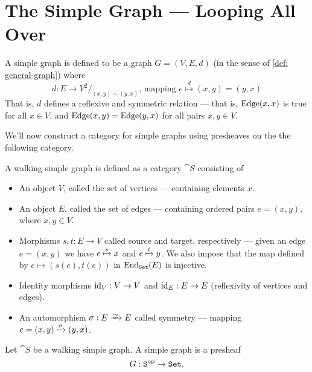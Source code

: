 \section{The Simple Graph --- Looping All Over}

\begin{definition}\label{def: simp-graph}
    A simple graph is defined to be a graph \(G = (V, E, d)\) (in the sense of
    \cref{def: general-graph}) where
    \[
        d: E \to V^2/_{(x, y) \sim (y, x)}
        \text{, mapping }
        e \overset d \longmapsto (x, y) = (y, x)
    \]
    That is, \(d\) defines a reflexive and symmetric relation --- that is,
    \(\operatorname{Edge}(x, x)\) is true for all \(x \in V\), and \(\operatorname{Edge}(x, y) = \operatorname{Edge}(y, x)\)
    for all pairs \(x, y \in V\).
\end{definition}

We'll now construct a category for simple graphs using presheaves on the the
following category.

\begin{definition}\label{def: walking-simp-graph}
    A walking simple graph is defined as a category \(\cat S\) consisting of
    \begin{itemize}
        \setlength\itemsep{0.0em}
        \item An object \(V\), called the set of vertices --- containing elements
              \(x\).
        \item An object \(E\), called the set of edges --- containing ordered pairs
              \(e = (x, y)\), where \(x, y \in V\).
        \item Morphisms \(s, t: E \to V\) called source and target, respectively ---
              given an edge \(e = (x, y)\) we have \(e \xmapsto{s} x\) and \(e \xmapsto{t}
              y\). We also impose that the map defined by \(e \mapsto (s(e), t(e))\)
              in \(\operatorname{End}_{{\texttt{Set}}}(E)\) is injective.
        \item Identity morphisms \(\operatorname{id}_V: V \to V\) and \(\operatorname{id}_E: E \to E\)
              (reflexivity of vertices and edges).
        \item An automorphism \(\sigma: E \isoto E\) called symmetry --- mapping \(e =
              (x, y) \xmapsto\sigma (y, x)\).
    \end{itemize}
\end{definition}

\begin{proposition}\label{prop: simp-graph-presheaf}
    Let \(\cat S\) be a walking simple graph. A simple graph is a presheaf
    \[
        G: \texttt S^{\mathrm{op}} \to {\texttt{Set}}.
    \]
\end{proposition}

